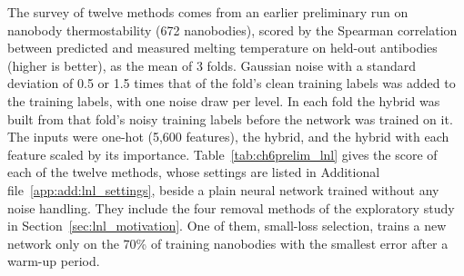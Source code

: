 The survey of twelve methods comes from an earlier preliminary run on nanobody thermostability (672 nanobodies), scored by the Spearman correlation between predicted and measured melting temperature on held-out antibodies (higher is better), as the mean of 3 folds. Gaussian noise with a standard deviation of 0.5 or 1.5 times that of the fold's clean training labels was added to the training labels, with one noise draw per level. In each fold the hybrid was built from that fold's noisy training labels before the network was trained on it. The inputs were one-hot (5,600 features), the hybrid, and the hybrid with each feature scaled by its importance. Table~\ref{tab:ch6prelim_lnl} gives the score of each of the twelve methods, whose settings are listed in Additional file~\ref{app:add:lnl_settings}, beside a plain neural network trained without any noise handling. They include the four removal methods of the exploratory study in Section~\ref{sec:lnl_motivation}. One of them, small-loss selection, trains a new network only on the 70\% of training nanobodies with the smallest error after a warm-up period.


